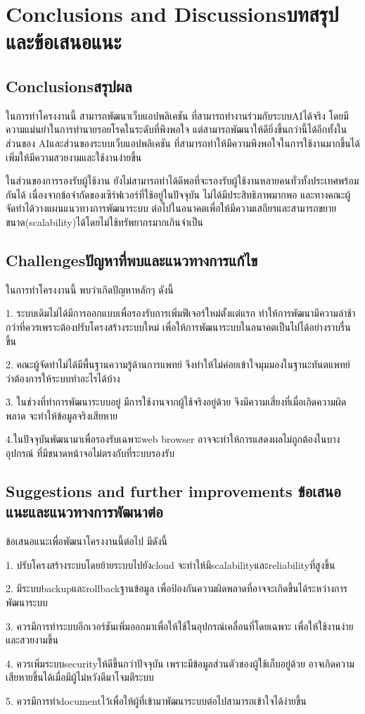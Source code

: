 \chapter{\ifenglish Conclusions and Discussions\else บทสรุปและข้อเสนอแนะ\fi}

\section{\ifenglish Conclusions\else สรุปผล\fi}

ในการทำโครงงานนี้ สามารถพัฒนาเว็บแอปพลิเคชัน ที่สามารถทำงานร่วมกับระบบAIได้จริง
โดยมีความแม่นยำในการทำนายรอยโรคในระดับที่พึงพอใจ แต่สามารถพัฒนาให้ดียิ่งขึ้นกว่านี้ได้อีกทั้งในส่วนของ
AIและส่วนของระบบเว็บแอปพลิเคชัน ที่สามารถทำให้มีความพึงพอใจในการใช้งานมากขึ้นได้ เพิ่มให้มีความสวยงามและใช้งานง่ายขึ้น


ในส่วนของการรองรับผู้ใช้งาน ยังไม่สามารถทำได้ดีพอที่จะรองรับผู้ใช้งานหลายคนทั่วทั้งประเทศพร้อมกันได้
เนื่องจากข้อจำกัดของเซิร์ฟเวอร์ที่ใช้อยู่ในปัจจุบัน ไม่ได้มีประสิทธิภาพมากพอ และทางคณะผู้จัดทำได้วางแผนแนวทางการพัฒนาระบบ
ต่อไปในอนาคตเพื่อให้มีความเสถียรและสามารถขยายขนาด(scalability)ได้โดยไม่ใช้ทรัพยากรมากเกินจำเป็น
\section{\ifenglish Challenges\else ปัญหาที่พบและแนวทางการแก้ไข\fi}

ในการทำโครงงานนี้ พบว่าเกิดปัญหาหลักๆ ดังนี้

1. ระบบเดิมไม่ได้มีการออกแบบเพื่อรองรับการเพิ่มฟีเจอร์ใหม่ตั้งแต่แรก ทำให้การพัฒนามีความล่าช้ากว่าที่ควรเพราะต้องปรับโครงสร้างระบบใหม่
เพื่อให้การพัฒนาระบบในอนาคตเป็นไปได้อย่างราบรื่นขึ้น

2. คณะผู้จัดทำไม่ได้มีพื้นฐานความรู้ด้านการแพทย์ จึงทำให้ไม่ค่อยเข้าใจมุมมองในฐานะทันตแพทย์
ว่าต้องการให้ระบบทำอะไรได้บ้าง 

3. ในช่วงที่ทำการพัฒนาระบบอยู่ มีการใช้งานจากผู้ใช้จริงอยู่ด้วย จึงมีความเสี่ยงที่เมื่อเกิดความผิดพลาด
จะทำให้ข้อมูลจริงเสียหาย

4.ในปัจจุบันพัฒนามาเพื่อรองรับเฉพาะweb browser อาจจะทำให้การแสดงผลไม่ถูกต้องในบางอุปกรณ์ ที่มีขนาดหน้าจอไม่ตรงกับที่ระบบรองรับ

\section{\ifenglish%
Suggestions and further improvements
\else%
ข้อเสนอแนะและแนวทางการพัฒนาต่อ
\fi
}

ข้อเสนอแนะเพื่อพัฒนาโครงงานนี้ต่อไป มีดังนี้

1. ปรับโครงสร้างระบบโดยย้ายระบบไปยังcloud จะทำให้มีscalabilityและreliabilityที่สูงขึ้น

2. มีระบบbackupและrollbackฐานข้อมูล เพื่อป้องกันความผิดพลาดที่อาจจะเกิดขึ้นได้ระหว่างการพัฒนาระบบ

3. ควรมีการทำระบบอีกเวอร์ชันเพิ่มออกมาเพื่อให้ใช้ในอุปกรณ์เคลื่อนที่โดยเฉพาะ เพื่อให้ใช้งานง่าย
และสวยงามขึ้น

4. ควรเพิ่มระบบsecurityให้ดีขึ้นกว่าปัจจุบัน เพราะมีข้อมูลส่วนตัวของผู้ใช้เก็บอยู่ด้วย
อาจเกิดความเสียหายขึ้นได้เมื่อมีผู้ไม่หวังดีมาโจมตีระบบ

5. ควรมีการทำdocumentไว้เพื่อให้ผู้ที่เข้ามาพัฒนาระบบต่อไปสามารถเข้าใจได้ง่ายขึ้น

